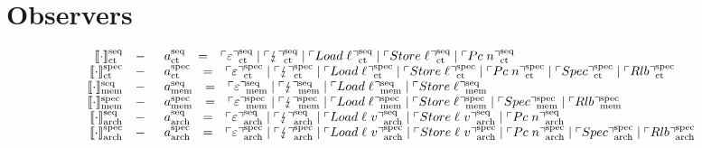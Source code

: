\documentclass[12pt]{article}
\newcommand{\ccseqct}{\ensuremath\llbracket\cdot\rrbracket^{\text{seq}}_{\text{ct}}}
\newcommand{\ccseqmem}{\ensuremath\llbracket\cdot\rrbracket^{\text{seq}}_{\text{mem}}}
\newcommand{\ccspecmem}{\ensuremath\llbracket\cdot\rrbracket^{\text{spec}}_{\text{mem}}}
\newcommand{\ccspecct}{\ensuremath\llbracket\cdot\rrbracket^{\text{spec}}_{\text{ct}}}
\newcommand{\ccseqarch}{\ensuremath\llbracket\cdot\rrbracket^{\text{seq}}_{\text{arch}}}
\newcommand{\ccspecarch}{\ensuremath\llbracket\cdot\rrbracket^{\text{spec}}_{\text{arch}}}
\begin{document}
\section{Observers}

\[
  \begin{array}{rcl}
  \ccseqct &-&
    \begin{array}{rcl}
      \seqctEvent & = & \seqctev{\emptyevent} \mid %
                        \seqctev{\lightning} \mid %
                        \seqctev{Load\;\varLoc} \mid %
                        \seqctev{Store\;\varLoc} \mid %
                        \seqctev{Pc\;n}
    \end{array} \\
  \ccspecct &-&
    \begin{array}{rcl}
      \specctEvent & = & \specctev{\emptyevent} \mid %
                         \specctev{\lightning} \mid %
                         \specctev{Load\;\varLoc} \mid %
                         \specctev{Store\;\varLoc} \mid %
                         \specctev{Pc\;n} \mid %
                         \specctev{Spec} \mid %
                         \specctev{Rlb} 
    \end{array} \\
  \ccseqmem &-&
    \begin{array}{rcl}
      \seqmemEvent & = & \seqmemev{\emptyevent} \mid %
                         \seqmemev{\lightning} \mid %
                         \seqmemev{Load\;\varLoc} \mid %
                         \seqmemev{Store\;\varLoc}
    \end{array} \\
  \ccspecmem &-&
    \begin{array}{rcl}
      \specmemEvent & = & \specmemev{\emptyevent} \mid %
                          \specmemev{\lightning} \mid %
                          \specmemev{Load\;\varLoc} \mid %
                          \specmemev{Store\;\varLoc} \mid %
                          \specmemev{Spec} \mid %
                          \specmemev{Rlb} 
    \end{array} \\
  \ccseqarch &-&
    \begin{array}{rcl}
      \seqarchEvent & = & \seqarchev{\emptyevent} \mid %
                          \seqarchev{\lightning} \mid %
                          \seqarchev{Load\;\varLoc\;v} \mid %
                          \seqarchev{Store\;\varLoc\;v} \mid %
                          \seqarchev{Pc\;n}
    \end{array} \\
  \ccspecarch &-&
    \begin{array}{rcl}
      \specarchEvent & = & \specarchev{\emptyevent} \mid %
                           \specarchev{\lightning} \mid %
                           \specarchev{Load\;\varLoc\;v} \mid %
                           \specarchev{Store\;\varLoc\;v} \mid %
                           \specarchev{Pc\;n} \mid %
                           \specarchev{Spec} \mid %
                           \specarchev{Rlb} 
    \end{array} \\
  \end{array}
\]
\end{document}
